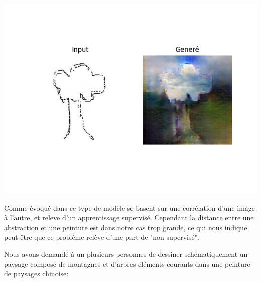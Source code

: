 \documentclass[a4paper, 12pt]{book}
\begin{document}
\begin{center}
\includegraphics[scale=0.7]{images/pix2pix-fail.png}
\label{fig1}
\end{center}


Comme évoqué dans \cite{DBLP:journals/corr/abs-1805-00247} ce type de modèle se basent sur une corrélation d'une image à l'autre, et relève d'un apprentissage supervisé. Cependant la distance entre une abstraction et une peinture est dans notre cas trop grande, ce qui nous indique peut-être que ce problème relève d'une part de "non supervisé". 


Nous avons demandé à un plusieurs personnes de dessiner schématiquement un paysage composé de montagnes et d'arbres éléments courants dans une peinture de paysages chinoise: 
\end{document}
